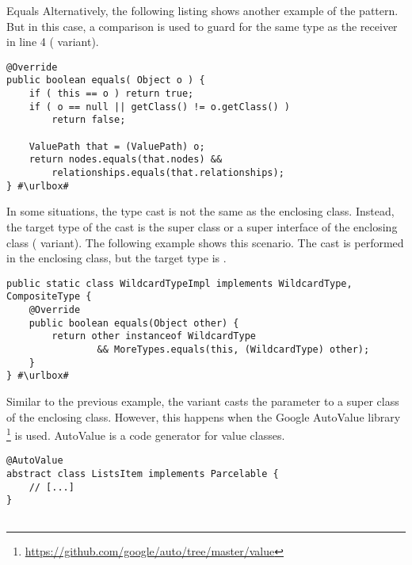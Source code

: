 \begin{pattern}{Equals}
Alternatively, the following listing shows another example of the \thisp{} pattern.
But in this case,
a  comparison is used to guard for the same type as the receiver in line 4 ( variant).

\def\urlvar{http://bit.ly/neo4j_neo4j_2vKP0MW}
\begin{verbatim}
@Override
public boolean equals( Object o ) {
    if ( this == o ) return true;
    if ( o == null || getClass() != o.getClass() )
        return false;

    ValuePath that = (ValuePath) o;
    return nodes.equals(that.nodes) &&
        relationships.equals(that.relationships);
} #\urlbox#
\end{verbatim}

In some situations, the type cast is not the same as the enclosing class.
Instead, the target type of the cast is the super class or a super interface of the enclosing class ( variant).
The following example shows this scenario.
The cast is performed in the  enclosing class,
but the target type is .

\def\urlvar{http://bit.ly/elastic_elasticsearch_2GHyPp5}
\begin{verbatim}
public static class WildcardTypeImpl implements WildcardType, CompositeType {
    @Override
    public boolean equals(Object other) {
        return other instanceof WildcardType
                && MoreTypes.equals(this, (WildcardType) other);
    }
} #\urlbox#
\end{verbatim}

Similar to the previous example, 
the  variant casts the  parameter to a super class of the enclosing class.
However, this happens when the Google AutoValue library%
\footnote{\url{https://github.com/google/auto/tree/master/value}}
is used.
AutoValue is a code generator for value classes.

\def\urlvar{http://bit.ly/square_sqlbrite_2HmHMYE}
\begin{verbatim}
@AutoValue
abstract class ListsItem implements Parcelable {
    // [...]
}


\end{verbatim}
\end{pattern}
